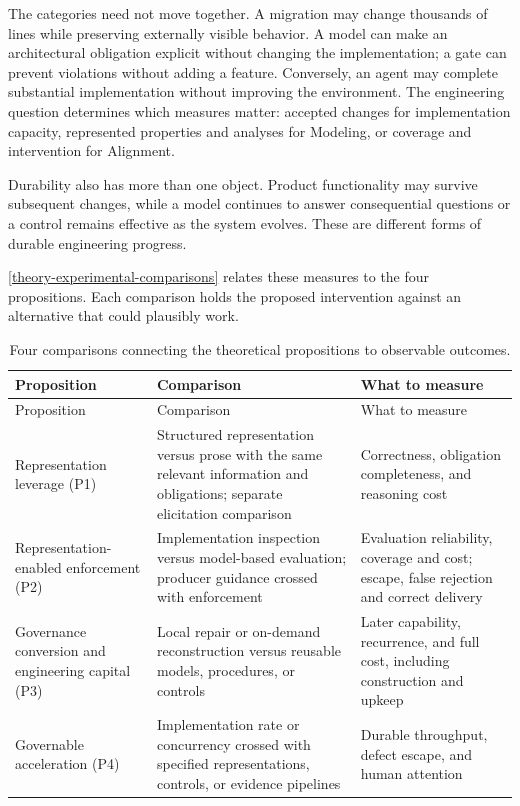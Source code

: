 The categories need not move together. A migration may change thousands of lines while preserving externally visible behavior. A model can make an architectural obligation explicit without changing the implementation; a gate can prevent violations without adding a feature. Conversely, an agent may complete substantial implementation without improving the environment. The engineering question determines which measures matter: accepted changes for implementation capacity, represented properties and analyses for Modeling, or coverage and intervention for Alignment.

Durability also has more than one object. Product functionality may survive subsequent changes, while a model continues to answer consequential questions or a control remains effective as the system evolves. These are different forms of durable engineering progress.

\autoref{theory-experimental-comparisons} relates these measures to the four propositions. Each comparison holds the proposed intervention against an alternative that could plausibly work.

{\footnotesize
\begin{longtable}[]{@{}
  >{\raggedright\arraybackslash}p{}
  >{\raggedright\arraybackslash}p{}
  >{\raggedright\arraybackslash}p{}@{}}
\caption[Comparisons that distinguish MAGE's proposed effects]{Four comparisons connecting the theoretical propositions to observable outcomes.}\label{theory-experimental-comparisons}\tabularnewline
\toprule\noalign{}
Proposition & Comparison & What to measure \\
\midrule\noalign{}
\endfirsthead
\toprule\noalign{}
Proposition & Comparison & What to measure \\
\midrule\noalign{}
\endhead
\bottomrule\noalign{}
\endlastfoot
Representation leverage (P1) & Structured representation versus prose with the same relevant information and obligations; separate elicitation comparison & Correctness, obligation completeness, and reasoning cost \\
Representation-enabled enforcement (P2) & Implementation inspection versus model-based evaluation; producer guidance crossed with enforcement & Evaluation reliability, coverage and cost; escape, false rejection and correct delivery \\
Governance conversion and engineering capital (P3) & Local repair or on-demand reconstruction versus reusable models, procedures, or controls & Later capability, recurrence, and full cost, including construction and upkeep \\
Governable acceleration (P4) & Implementation rate or concurrency crossed with specified representations, controls, or evidence pipelines & Durable throughput, defect escape, and human attention \\
\end{longtable}
}

